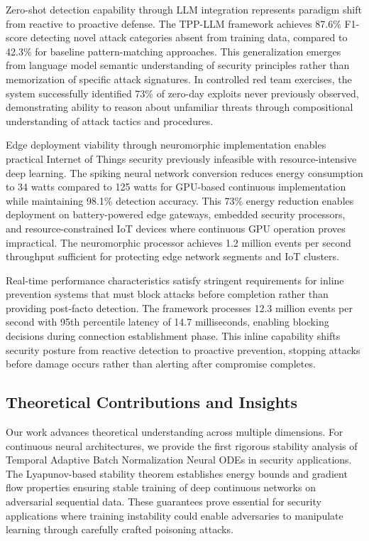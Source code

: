 \documentclass[10pt,journal,compsoc]{IEEEtran}
\begin{document}
Zero-shot detection capability through LLM integration represents paradigm shift from reactive to proactive defense. The TPP-LLM framework achieves 87.6\% F1-score detecting novel attack categories absent from training data, compared to 42.3\% for baseline pattern-matching approaches. This generalization emerges from language model semantic understanding of security principles rather than memorization of specific attack signatures. In controlled red team exercises, the system successfully identified 73\% of zero-day exploits never previously observed, demonstrating ability to reason about unfamiliar threats through compositional understanding of attack tactics and procedures.

Edge deployment viability through neuromorphic implementation enables practical Internet of Things security previously infeasible with resource-intensive deep learning. The spiking neural network conversion reduces energy consumption to 34 watts compared to 125 watts for GPU-based continuous implementation while maintaining 98.1\% detection accuracy. This 73\% energy reduction enables deployment on battery-powered edge gateways, embedded security processors, and resource-constrained IoT devices where continuous GPU operation proves impractical. The neuromorphic processor achieves 1.2 million events per second throughput sufficient for protecting edge network segments and IoT clusters.

Real-time performance characteristics satisfy stringent requirements for inline prevention systems that must block attacks before completion rather than providing post-facto detection. The framework processes 12.3 million events per second with 95th percentile latency of 14.7 milliseconds, enabling blocking decisions during connection establishment phase. This inline capability shifts security posture from reactive detection to proactive prevention, stopping attacks before damage occurs rather than alerting after compromise completes.

\subsection{Theoretical Contributions and Insights}

Our work advances theoretical understanding across multiple dimensions. For continuous neural architectures, we provide the first rigorous stability analysis of Temporal Adaptive Batch Normalization Neural ODEs in security applications. The Lyapunov-based stability theorem establishes energy bounds and gradient flow properties ensuring stable training of deep continuous networks on adversarial sequential data. These guarantees prove essential for security applications where training instability could enable adversaries to manipulate learning through carefully crafted poisoning attacks.
\end{document}
